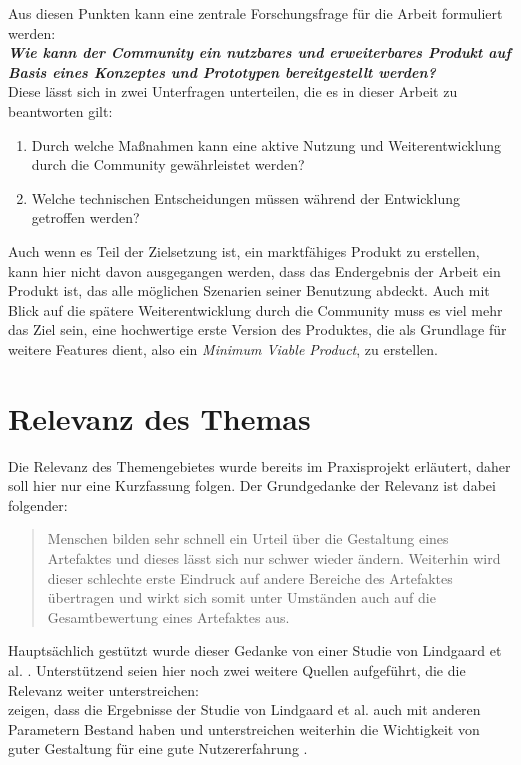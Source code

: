 
Aus diesen Punkten kann eine zentrale Forschungsfrage für die Arbeit formuliert werden:\\

\textit{\textbf{Wie kann der Community ein nutzbares und erweiterbares Produkt auf Basis eines Konzeptes und Prototypen bereitgestellt werden?}}\\

Diese lässt sich in zwei Unterfragen unterteilen, die es in dieser Arbeit zu beantworten gilt:
\begin{enumerate}
  \item Durch welche Maßnahmen kann eine aktive Nutzung und Weiterentwicklung durch die Community gewährleistet werden?
  \item Welche technischen Entscheidungen müssen während der Entwicklung getroffen werden?
\end{enumerate}

Auch wenn es Teil der Zielsetzung ist, ein marktfähiges Produkt zu erstellen, kann hier nicht davon ausgegangen werden, dass das Endergebnis der Arbeit ein Produkt ist, das alle möglichen Szenarien seiner Benutzung abdeckt. Auch mit Blick auf die spätere Weiterentwicklung durch die Community muss es viel mehr das Ziel sein, eine hochwertige erste Version des Produktes, die als Grundlage für weitere Features dient, also ein \textit{Minimum Viable Product}, zu erstellen.


\section{Relevanz des Themas}
\label{sec:relevance}
Die Relevanz des Themengebietes wurde bereits im Praxisprojekt erläutert, daher soll hier nur eine Kurzfassung folgen. Der Grundgedanke der Relevanz ist dabei folgender:

\begin{quote}
  Menschen bilden sehr schnell ein Urteil über die Gestaltung eines Artefaktes und dieses lässt sich nur schwer wieder ändern. Weiterhin wird dieser schlechte erste Eindruck auf andere Bereiche des Artefaktes übertragen und wirkt sich somit unter Umständen auch auf die Gesamtbewertung eines Artefaktes aus. \cite{PoplawskiPP}
\end{quote}

Hauptsächlich gestützt wurde dieser Gedanke von einer Studie von Lindgaard et al. \cite{lindgaard2006attention}. Unterstützend seien hier noch zwei weitere Quellen aufgeführt, die die Relevanz weiter unterstreichen:\\
\cite{tractinsky2006evaluating} zeigen, dass die Ergebnisse der Studie von Lindgaard et al. auch mit anderen Parametern Bestand haben und unterstreichen weiterhin die Wichtigkeit von guter Gestaltung für eine gute Nutzererfahrung \cite{tractinsky2000beautiful}.

